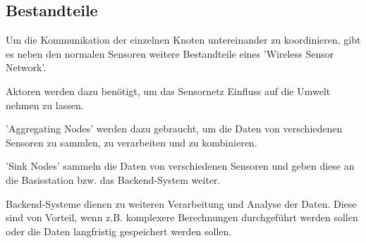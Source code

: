 \subsection{Bestandteile}\label{ss:Bestandteile}

Um die Kommunikation der einzelnen Knoten untereinander zu koordinieren, gibt es neben den normalen Sensoren weitere Bestandteile eines 'Wireless Sensor Network'.

Aktoren werden dazu benötigt, um das Sensornetz Einfluss auf die Umwelt nehmen zu lassen.

'Aggregating Nodes' werden dazu gebraucht, um die Daten von verschiedenen Sensoren zu sammlen, zu verarbeiten und zu kombinieren.

'Sink Nodes' sammeln die Daten von verschiedenen Sensoren und geben diese an die Basisstation bzw. das Backend-System weiter.

Backend-Systeme dienen zu weiteren Verarbeitung und Analyse der Daten.
Diese sind von Vorteil, wenn z.B. komplexere Berechnungen durchgeführt werden sollen oder die Daten langfristig gespeichert werden sollen.